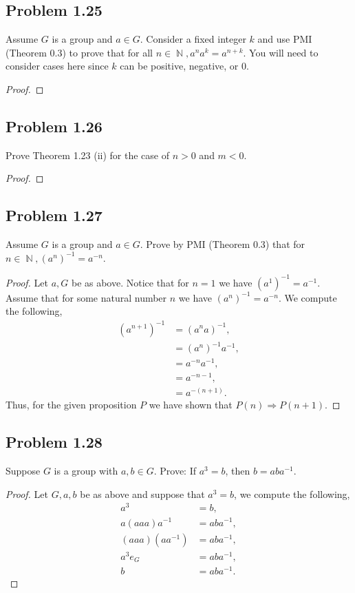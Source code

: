 \documentclass{amsbook}
\DeclareMathOperator{\N}{\mathbb{N}}
\begin{document}
			\subsection*{Problem 1.25}
			\label{sub:problem_1_25}
			Assume $G$ is a group and $a \in G$. 
			Consider a fixed integer $k$ and use PMI (Theorem 0.3) to prove that for all $n \in \N, a^{n}a^{k} = a^{n+k}$. 
			You will need to consider cases here since $k$ can be positive, negative, or 0.
			\begin{proof}
			\end{proof}

			\subsection*{Problem 1.26}
			\label{sub:problem_1_26}
			Prove Theorem 1.23 (ii) for the case of $n > 0$ and $m < 0$.
			\begin{proof}
			\end{proof}

			\subsection*{Problem 1.27}
			\label{sub:problem_1_27}
			Assume $G$ is a group and $a \in G$. 
			Prove by PMI (Theorem 0.3) that for $n \in \N, \left(a^{n}\right)^{-1} = a^{-n}$.
			\begin{proof} Let $a,G$ be as above.
			Notice that for $n=1$ we have $(a^{1})^{-1} = a^{-1}$.
			Assume that for some natural number $n$ we have $(a^{n})^{-1} = a^{-n}$.
			We compute the following,
				\begin{align*}
					\left( a^{n+1} \right)^{-1} &= \left( a^{n} a \right)^{-1}, \\
					&= (a^{n})^{-1} a^{-1}, \\
					&= a^{-n} a^{-1}, \\
					&= a^{-n-1}, \\
					&= a^{-(n+1)}.
				\end{align*}
			Thus, for the given proposition $P$ we have shown that $P(n) \Rightarrow P(n+1)$.			
			\end{proof}

			\subsection*{Problem 1.28}
			\label{sub:problem_1_28}
			Suppose $G$ is a group with $a, b \in G$. 
			Prove: If $a^{3} = b$, then $b = aba^{-1}$.
			\begin{proof} Let $G,a,b$ be as above and suppose that $a^{3} = b$, we compute the following,
				\begin{align*}
					a^{3} &= b, \\
					a(aaa)a^{-1} &= aba^{-1}, \\
					(aaa)\left(aa^{-1}\right) &= aba^{-1}, \\
					a^{3}e_{G} &= aba^{-1}, \\
					b &= aba^{-1}.
				\end{align*}
			\end{proof}
\end{document}
